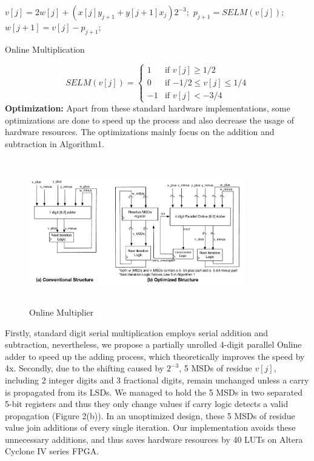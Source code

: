 \documentclass{sig-alternate}
\begin{document}
	\begin{algorithm}
		\begin{algorithmic}[1]
			\newline
	
				\State $v[j] = 2w[j] + (x[j]y_{j+1}+y[j+1]x_{j})2^{-3};$
				\State $p_{j+1} = SELM(v[j]);$
				\State $w[j+1] = v[j] - p_{j+1};$
			\EndFor
		\end{algorithmic}
		\caption{Online Multiplication}
		\label{alg:algorithm1}
	\end{algorithm}	
	\vspace{-15pt}
	\begin{equation}
		SELM (v[j]) = \begin{cases}
		1 &\text{if $v[j] \geq 1/2$}\\
		0 &\text{if $-1/2 \leq v[j] \leq1/4$}\\
		-1 &\text{if $v[j]<-3/4$ }
		\end{cases} 
	\end{equation}
	\noindent
	{\bf Optimization: }Apart from these standard hardware implementations, some optimizations are done to speed up the process and also decrease the usage of hardware resources. The optimizations mainly focus on the addition and subtraction in Algorithm1.
	\vspace{-10pt}
	\begin{figure} [ht]
		\centering
		\includegraphics[height=2.5in,width=3.7in]{dividing_upper_block}
		\caption{Online Multiplier}
	\end{figure}
	\vspace{-10pt}
	
	Firstly, standard digit serial multiplication employs serial addition and subtraction, nevertheless, we propose a partially unrolled 4-digit parallel Online adder to speed up the adding process, which theoretically improves the speed by 4x. Secondly, due to the shifting caused by $2^{-3}$, 5 MSDs of residue $v[j]$, including 2 integer digits and 3 fractional digits, remain unchanged unless a carry is propagated from its LSDs. 
	We managed to hold the 5 MSDs in two separated 5-bit registers and thus they only change values if carry logic detects a valid propagation (Figure 2(b)). In an unoptimized design, these 5 MSDs of residue value join additions of every single iteration. 
	Our implementation avoids these unnecessary additions, and thus saves hardware resources by 40 LUTs on Altera Cyclone IV series FPGA.     
	
\end{document}
